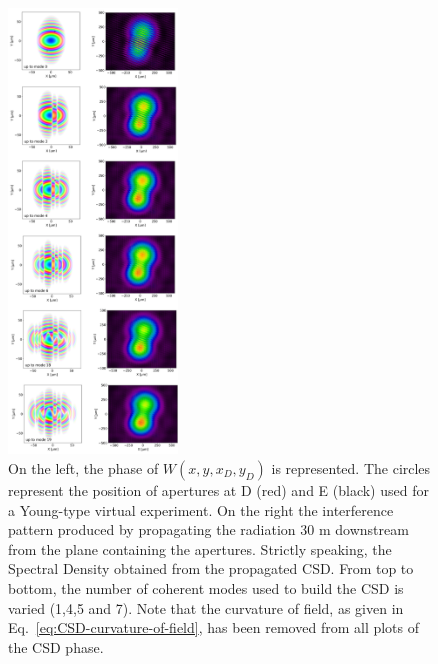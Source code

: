 \documentclass[%
 reprint,
 amsmath,amssymb,
 aps,
]{revtex4-1}
\begin{document}
\begin{figure}
\includegraphics[width=0.4\textwidth]{Figures/interference-low-resolution.png}
\caption{On the left, the phase of $W(x,y,x_{D},y_{D})$ is represented. The circles represent the position of apertures at D (red) and E (black) used for a Young-type virtual experiment. On the right the interference pattern produced by propagating the radiation 30 m downstream from the plane containing the apertures. Strictly speaking, the Spectral Density obtained from the propagated CSD. From top to bottom, the number of coherent modes used to build the CSD is varied (1,4,5 and 7). Note that the curvature of field, as given in Eq.~\ref{eq:CSD-curvature-of-field}, has been removed from all plots of the CSD phase.}
%
%
%
%
%
%
\label{young}
\end{figure}
\end{document}
